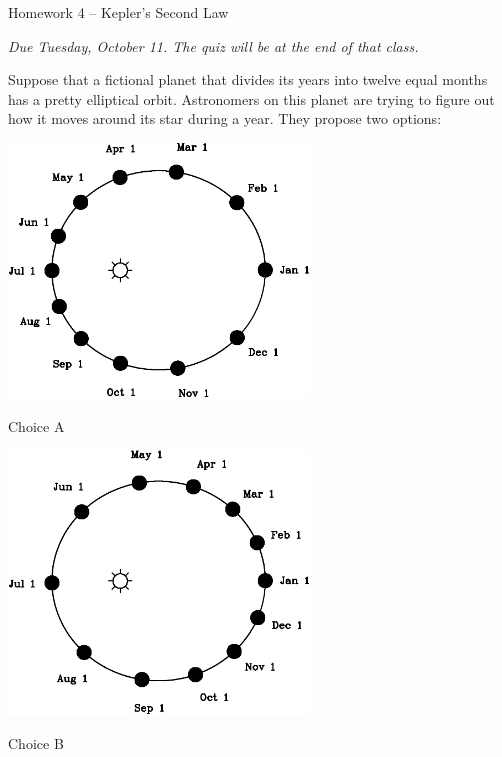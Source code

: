 \documentclass[12pt]{article}
\begin{document}
\newpage

\begin{center}
	\sc \Large Homework 4 -- Kepler's Second Law
	
	\normalsize \it Due Tuesday, October 11. The quiz will be at the end of that class.
\end{center}

Suppose that a fictional planet that divides its years into twelve equal months has a pretty elliptical orbit. Astronomers on this planet are trying to figure out how it moves around its star during a year. They propose two options:

\bigskip

\begin{minipage}{0.5\textwidth}
	\begin{center}
		\includegraphics[width=0.6\textwidth]{choice2-crop.pdf}
		
		Choice A
	\end{center}
\end{minipage}
\begin{minipage}{0.5\textwidth}
	\begin{center}
		\includegraphics[width=0.6\textwidth]{choice1-crop.pdf}
		
		Choice B
	\end{center}
\end{minipage}
\end{document}
